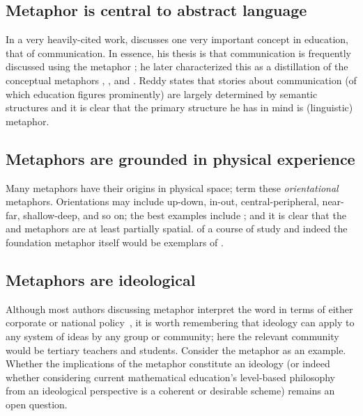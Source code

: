 \subsection{Metaphor is central to abstract language}

In a very heavily-cited work,  discusses one very
important concept in education, that of communication.  In essence,
his thesis is that communication is frequently discussed using the
 metaphor \parencite{lakoff1980}; he later characterized this
as a distillation of the conceptual metaphors , , and
.  Reddy states that stories about
communication (of which education figures prominently) are largely determined by semantic structures and it is
clear that the primary structure he has in mind is (linguistic)
metaphor.

\subsection{Metaphors are grounded in physical experience}

Many metaphors have their origins in physical space; 
term these \emph{orientational} metaphors.  Orientations may include
up-down, in-out, central-peripheral, near-far, shallow-deep, and so on; the best
examples include ; 
and it is clear that the  and  metaphors are at least
partially spatial.   of a course of
study and indeed the foundation metaphor itself would be exemplars of
.

\subsection{Metaphors are ideological}

Although most authors discussing metaphor interpret the word
 in terms of either corporate or national
policy~\citep{perrez2015}, it is worth remembering that ideology can
apply to any system of ideas by any group or community; here the
relevant community would be tertiary teachers and students.  Consider
the  metaphor as an example.  Whether the implications
of the metaphor constitute an ideology (or indeed whether
considering current mathematical education's level-based philosophy
from an ideological perspective is a coherent or desirable scheme) remains an open
question.


